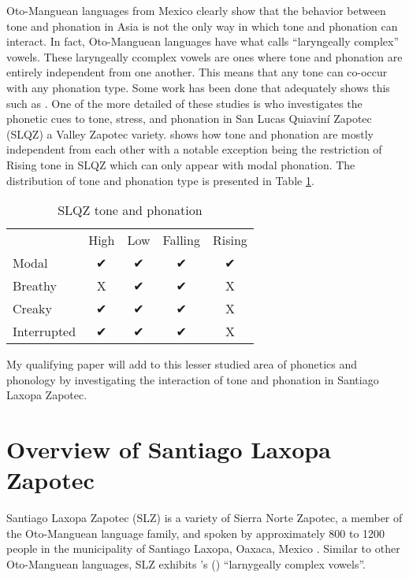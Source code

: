 \documentclass[12pt, letterpaper]{article}
\providecommand{\lsptoprule}{\midrule\toprule}
\providecommand{\lspbottomrule}{\bottomrule\midrule}
\begin{document}
Oto-Manguean languages from Mexico clearly show that the behavior between tone and phonation in Asia is not the only way in which tone and phonation can interact. In fact, Oto-Manguean languages have what \citet{silvermanLaryngealComplexityOtomanguean1997} calls ``laryngeally complex'' vowels. These laryngeally ccomplex vowels are ones where tone and phonation are entirely independent from one another. This means that any tone can co-occur with any phonation type. Some work has been done that adequately shows this such as \citet{avelinobecerraTopicsYalalagZapotec2004,chavez-peonInteractionMetricalStructure2010,dicanioCoarticulationToneGlottal2012,uchiharaToneRegistrogenesisQuiavini2016}. One of the more detailed of these studies is \citet{chavez-peonInteractionMetricalStructure2010} who investigates the phonetic cues to tone, stress, and phonation in San Lucas Quiaviní Zapotec (SLQZ) a Valley Zapotec variety. \citeauthor{chavez-peonInteractionMetricalStructure2010} shows how tone and phonation are mostly independent from each other with a notable exception being the restriction of Rising tone in SLQZ which can only appear with modal phonation. The distribution of tone and phonation type is presented in Table \ref{tab:slqz}.

\begin{table}[!ht]
\centering
\caption{SLQZ tone and phonation}
\label{tab:slqz}
 \begin{tabular}{lcccc}
  \lsptoprule
  				&	 High  & Low & Falling & Rising \\
  	Modal	& ✔︎ & ✔︎ & ✔︎ & ✔︎ \\
  	Breathy & X & ✔︎ & ✔︎ & X \\
  	Creaky & ✔︎ & ✔︎ & ✔︎ & X \\
  	Interrupted & ✔︎ & ✔︎ & ✔︎ & X \\
  \lspbottomrule
 \end{tabular}
\end{table}

My qualifying paper will add to this lesser studied area of phonetics and phonology by investigating the interaction of tone and phonation in Santiago Laxopa Zapotec.

\section{Overview of Santiago Laxopa Zapotec} \label{sec:SLZ}

Santiago Laxopa Zapotec (SLZ) is a variety of Sierra Norte Zapotec, a member of the Oto-Manguean language family, and spoken by approximately 800 to 1200 people in the municipality of Santiago Laxopa, Oaxaca, Mexico \citep{adlerDerivationVerbInitiality2018,sichelPronounsAttractionSierra2020}. Similar to other Oto-Manguean languages, SLZ exhibits \citeauthor{silvermanLaryngealComplexityOtomanguean1997}'s (\citeyear{silvermanLaryngealComplexityOtomanguean1997}) ``larnygeally complex vowels''. 
\end{document}
